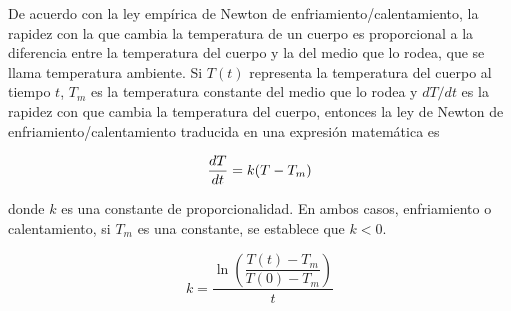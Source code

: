 De acuerdo con la ley empírica de Newton de enfriamiento/calentamiento, la rapidez con la que cambia la temperatura de un cuerpo es proporcional
a la diferencia entre la temperatura del cuerpo y la del medio que lo rodea, que se llama temperatura ambiente. Si $T(t)$ representa la 
temperatura del cuerpo al tiempo $t$, $T_m$ es la temperatura constante del medio que lo rodea y $dT/dt$ es la rapidez con que cambia la 
temperatura del cuerpo, entonces la ley de Newton de enfriamiento/calentamiento traducida en una expresión matemática es 

\begin{equation}
	{dT\over dt} = k(T-T_m)
	\label{eq:leyEnfCalNewton}
\end{equation}

donde $k$ es una constante de proporcionalidad. En ambos casos, enfriamiento o calentamiento, si $T_m$ es una constante, se establece que $k<0$.

\begin{equation}
	k = \frac{\ln \left( \dfrac{T(t)-T_m}{T(0)-T_m} \right)}{t}
	\label{eq:constanteLECNewton}
\end{equation}

